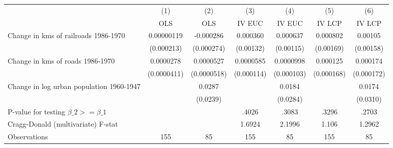 {
\def\sym#1{\ifmmode^{#1}\else\(^{#1}\)\fi}
\begin{tabular}{l*{6}{c}}
\hline\hline
                &\multicolumn{1}{c}{(1)}&\multicolumn{1}{c}{(2)}&\multicolumn{1}{c}{(3)}&\multicolumn{1}{c}{(4)}&\multicolumn{1}{c}{(5)}&\multicolumn{1}{c}{(6)}\\
                &\multicolumn{1}{c}{OLS}&\multicolumn{1}{c}{OLS}&\multicolumn{1}{c}{IV EUC}&\multicolumn{1}{c}{IV EUC}&\multicolumn{1}{c}{IV LCP}&\multicolumn{1}{c}{IV LCP}\\
\hline
Change in kms of railroads 1986-1970&0.00000119         &-0.000286         & 0.000360         & 0.000637         & 0.000802         &  0.00105         \\
                &(0.000213)         &(0.000274)         &(0.00132)         &(0.00115)         &(0.00169)         &(0.00158)         \\
[1em]
Change in kms of roads 1986-1970&0.0000278         &0.0000527         &0.0000585         &0.0000998         & 0.000125         & 0.000174         \\
                &(0.0000411)         &(0.0000518)         &(0.000114)         &(0.000103)         &(0.000168)         &(0.000172)         \\
[1em]
Change in log urban population 1960-1947&                  &   0.0287         &                  &   0.0184         &                  &   0.0174         \\
                &                  & (0.0239)         &                  & (0.0284)         &                  & (0.0310)         \\
\hline
P-value for testing $\beta\_{2} >= \beta\_{1}$&                  &                  &    .4026         &    .3083         &    .3296         &    .2703         \\
Cragg-Donald (multivariate) F-stat&                  &                  &   1.6924         &   2.1996         &    1.106         &   1.2962         \\
Observations    &      155         &       85         &      155         &       85         &      155         &       85         \\
\hline\hline
\end{tabular}
}
